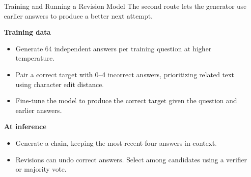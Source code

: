 \documentclass[aspectratio=1610,xcolor=dvipsnames,t]{beamer}
\begin{document}
\begin{frame}{Training and Running a Revision Model}
  The second route lets the generator use earlier answers to produce a better next attempt.
  \par\smallskip
  \textbf{Training data}
  \begin{itemize}
    \item Generate 64 independent answers per training question at higher temperature.
    \item Pair a correct target with 0--4 incorrect answers, prioritizing related text using character edit distance.
    \item Fine-tune the model to produce the correct target given the question and earlier answers.
  \end{itemize}
  \par\medskip
  \textbf{At inference}
  \begin{itemize}
    \item Generate a chain, keeping the most recent four answers in context.
    \item Revisions can undo correct answers. Select among candidates using a verifier or majority vote.
  \end{itemize}
\end{frame}
\end{document}
